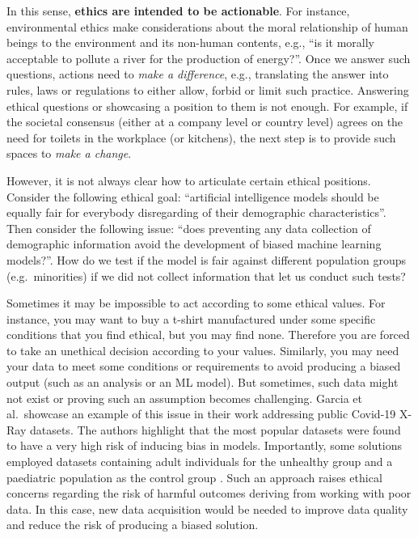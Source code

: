 \documentclass[
]{book}
\begin{document}
In this sense, \textbf{ethics are intended to be actionable}. For instance, environmental ethics \citep{sep-ethics-environmental} make considerations about the moral relationship of human beings to the environment and its non-human contents, e.g., ``is it morally acceptable to pollute a river for the production of energy?''. Once we answer such questions, actions need to \emph{make a difference}, e.g., translating the answer into rules, laws or regulations to either allow, forbid or limit such practice. Answering ethical questions or showcasing a position to them is not enough. For example, if the societal consensus (either at a company level or country level) agrees on the need for toilets in the workplace (or kitchens), the next step is to provide such spaces to \emph{make a change}.

However, it is not always clear how to articulate certain ethical positions. Consider the following ethical goal: ``artificial intelligence models should be equally fair for everybody disregarding of their demographic characteristics''. Then consider the following issue: ``does preventing any data collection of demographic information avoid the development of biased machine learning models?''. How do we test if the model is fair against different population groups (e.g.~minorities) if we did not collect information that let us conduct such tests?

Sometimes it may be impossible to act according to some ethical values. For instance, you may want to buy a t-shirt manufactured under some specific conditions that you find ethical, but you may find none. Therefore you are forced to take an unethical decision according to your values. Similarly, you may need your data to meet some conditions or requirements to avoid producing a biased output (such as an analysis or an ML model). But sometimes, such data might not exist or proving such an assumption becomes challenging. Garcia et al.~showcase an example of this issue in their work addressing public Covid-19 X-Ray datasets. The authors highlight that the most popular datasets were found to have a very high risk of inducing bias in models. Importantly, some solutions employed datasets containing adult individuals for the unhealthy group and a paediatric population as the control group \citep{santa2021public}. Such an approach raises ethical concerns regarding the risk of harmful outcomes deriving from working with poor data. In this case, new data acquisition would be needed to improve data quality and reduce the risk of producing a biased solution.
\end{document}
